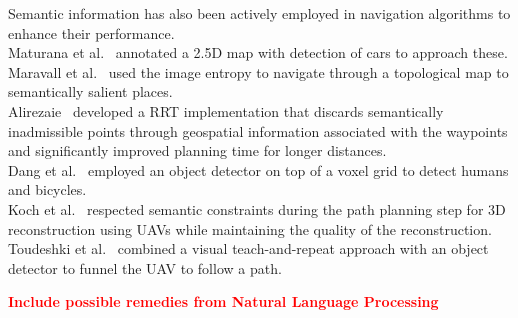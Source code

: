 \documentclass[twocolumn,letterpaper]{IEEEAerospaceCLS}  %
\newcommand\todo[1]{\textbf{\textcolor{red}{#1}}}
\begin{document}
Semantic information has also been actively employed in navigation algorithms to enhance their performance.\\
Maturana et al.~\cite{maturana_looking_2017} annotated a 2.5D map with detection of cars to approach these.\\
Maravall et al.~\cite{maravall_navigation_2017} used the image entropy to navigate through a topological map to semantically salient places.\\
Alirezaie~\cite{alirezaie_exploiting_2017} developed a RRT implementation that discards semantically inadmissible points through geospatial information associated with the waypoints and significantly improved planning time for longer distances.\\
Dang et al.~\cite{dang_autonomous_2018} employed an object detector on top of a voxel grid to detect humans and bicycles.\\
Koch et al.~\cite{koch_automatic_2019} respected semantic constraints during the path planning step for 3D reconstruction using UAVs while maintaining the quality of the reconstruction.
Toudeshki et al.~\cite{toudeshki_robust_2018} combined a visual teach-and-repeat approach with an object detector to funnel the UAV to follow a path.

\todo{Include possible remedies from Natural Language Processing}
\end{document}
